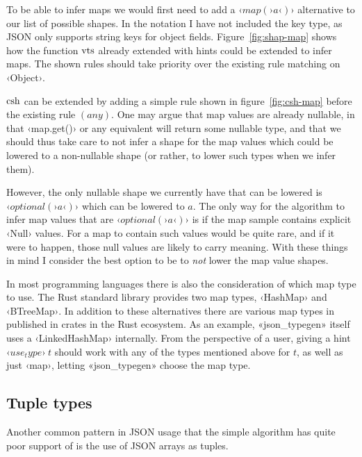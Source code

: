 To be able to infer maps we would first need to add a $‹map(›a‹)›$ alternative to our list of possible shapes. In the notation I have not included the key type, as JSON only supports string keys for object fields. Figure~\ref{fig:shap-map} shows how the function $\operatorname{vts}$ already extended with hints could be extended to infer maps. The shown rules should take priority over the existing rule matching on ‹Object›.

$\operatorname{csh}$ can be extended by adding a simple rule shown in figure~\ref{fig:csh-map} before the existing rule $(any)$. One may argue that map values are already nullable, in that ‹map.get()› or any equivalent will return some nullable type, and that we should thus take care to not infer a shape for the map values which could be lowered to a non-nullable shape (or rather, to lower such types when we infer them).

However, the only nullable shape we currently have that can be lowered is $‹optional(›a‹)›$ which can be lowered to $a$. The only way for the algorithm to infer map values that are $‹optional(›a‹)›$ is if the map sample contains explicit ‹Null› values. For a map to contain such values would be quite rare, and if it were to happen, those null values are likely to carry meaning. With these things in mind I consider the best option to be to \emph{not} lower the map value shapes.

In most programming languages there is also the consideration of which map type to use. The Rust standard library provides two map types, ‹HashMap› and ‹BTreeMap›. In addition to these alternatives there are various map types in published in crates in the Rust ecosystem. As an example, «json_typegen» itself uses a ‹LinkedHashMap› internally. From the perspective of a user, giving a hint $‹use_type›\ t$ should work with any of the types mentioned above for $t$, as well as just ‹map›, letting «json_typegen» choose the map type.


\subsection{Tuple types}

Another common pattern in JSON usage that the simple algorithm has quite poor support of is the use of JSON arrays as tuples.


